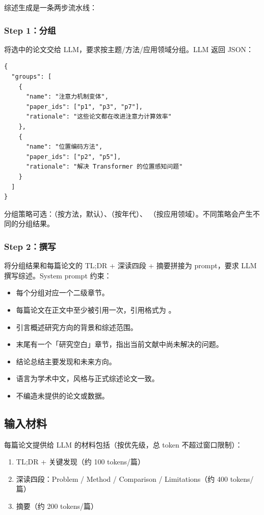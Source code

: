 综述生成是一条两步流水线：

\subsubsection{Step 1：分组}

将选中的论文交给 LLM，要求按主题/方法/应用领域分组。LLM 返回 JSON：

\begin{verbatim}
{
  "groups": [
    {
      "name": "注意力机制变体",
      "paper_ids": ["p1", "p3", "p7"],
      "rationale": "这些论文都在改进注意力计算效率"
    },
    {
      "name": "位置编码方法",
      "paper_ids": ["p2", "p5"],
      "rationale": "解决 Transformer 的位置感知问题"
    }
  ]
}
\end{verbatim}

分组策略可选：（按方法，默认）、（按年代）、
（按应用领域）。不同策略会产生不同的分组结果。

\subsubsection{Step 2：撰写}

将分组结果和每篇论文的 TL;DR + 深读四段 + 摘要拼接为 prompt，要求 LLM
撰写综述。System prompt 约束：

\begin{itemize}
  \item 每个分组对应一个二级章节。
  \item 每篇论文在正文中至少被引用一次，引用格式为 。
  \item 引言概述研究方向的背景和综述范围。
  \item 末尾有一个「研究空白」章节，指出当前文献中尚未解决的问题。
  \item 结论总结主要发现和未来方向。
  \item 语言为学术中文，风格与正式综述论文一致。
  \item 不编造未提供的论文或数据。
\end{itemize}

\subsection{输入材料}

每篇论文提供给 LLM 的材料包括（按优先级，总 token 不超过窗口限制）：

\begin{enumerate}
  \item TL;DR + 关键发现（约 100 tokens/篇）
  \item 深读四段：Problem / Method / Comparison / Limitations（约 400 tokens/篇）
  \item 摘要（约 200 tokens/篇）
\end{enumerate}

